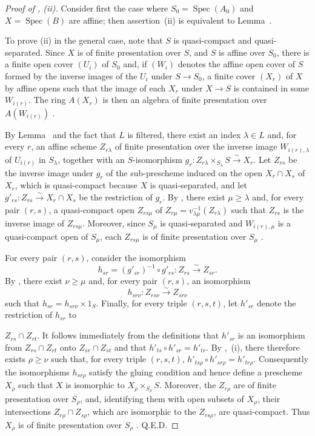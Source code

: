 \begin{proof}[Proof of , (ii)]
Consider first the case where $S_0=\operatorname{Spec}(A_0)$ and $X=\operatorname{Spec}(B)$ are affine; then assertion~(ii) is equivalent to Lemma~.

To prove (ii) in the general case, note that $S$ is quasi-compact and quasi-separated. Since $X$ is of finite presentation over $S$, and $S$ is affine over $S_0$, there is a finite open cover $(U_i)$ of $S_0$ and, if $(W_i)$ denotes the affine open cover of $S$ formed by the inverse images of the $U_i$ under $S\to S_0$, a finite cover $(X_r)$ of $X$ by affine opens such that the image of each $X_r$ under $X\to S$ is contained in some $W_{i(r)}$. The ring $A(X_r)$ is then an algebra of finite presentation over $A(W_{i(r)})$ .

By Lemma~ and the fact that $L$ is filtered, there exist an index $\lambda\in L$ and, for every $r$, an affine scheme $Z_{r\lambda}$ of finite presentation over the inverse image $W_{i(r),\lambda}$ of $U_{i(r)}$ in $S_\lambda$, together with an $S$-isomorphism $g_r:Z_{r\lambda}\times_{S_\lambda}S\xrightarrow{\sim}X_r$.
Let $Z_{rs}$ be the inverse image under $g_r$ of the sub-prescheme induced on the open $X_r\cap X_s$ of $X_r$, which is quasi-compact because $X$ is quasi-separated, and let $g'_{rs}:Z_{rs}\xrightarrow{\sim}X_r\cap X_s$
be the restriction of $g_r$. By , there exist $\mu\geqslant\lambda$ and, for every pair $(r,s)$, a quasi-compact open $Z_{rs\mu}$ of $Z_{r\mu}=v_{\lambda\mu}^{-1}(Z_{r\lambda})$ such that $Z_{rs}$ is the inverse image of $Z_{rs\mu}$. Moreover, since $S_\mu$ is quasi-separated and $W_{i(r),\mu}$ is a quasi-compact open of $S_\mu$, each $Z_{rs\mu}$ is of finite presentation over $S_\mu$ .

For every pair $(r,s)$, consider the isomorphism
\[
 h_{sr}=(g'_{sr})^{-1}\circ g'_{rs}:Z_{rs}\xrightarrow{\sim}Z_{sr}.
\]
By , there exist $\nu\geqslant\mu$ and, for every pair $(r,s)$, an isomorphism
\[
 h_{sr\nu}:Z_{rs\nu}\xrightarrow{\sim}Z_{sr\nu}
\]
such that $h_{sr}=h_{sr\nu}\times 1_S$. Finally, for every triple $(r,s,t)$, let $h'_{sr}$ denote the restriction of $h_{sr}$ to


$Z_{rs}\cap Z_{rt}$. It follows immediately from the definitions that $h'_{sr}$ is an isomorphism from $Z_{rs}\cap Z_{rt}$ onto $Z_{sr}\cap Z_{st}$ and that $h'_{ts}\circ h'_{sr}=h'_{tr}$.
By ,~(i), there therefore exists $\rho\geqslant\nu$ such that, for every triple $(r,s,t)$, $h'_{ts\rho}\circ h'_{sr\rho}=h'_{tr\rho}$.
Consequently the isomorphisms $h_{sr\rho}$ satisfy the gluing condition  and hence define a prescheme $X_\rho$ such that $X$ is isomorphic to $X_\rho\times_{S_\rho}S$. Moreover, the $Z_{r\rho}$ are of finite presentation over $S_\rho$, and, identifying them with open subsets of $X_\rho$, their intersections $Z_{r\rho}\cap Z_{s\rho}$, which are isomorphic to the $Z_{rs\rho}$, are quasi-compact. Thus $X_\rho$ is of finite presentation over $S_\rho$ . Q.E.D.
\end{proof}

